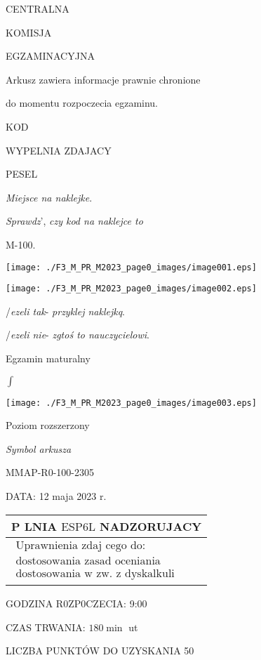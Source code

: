 \documentclass[a4paper,12pt]{article}
\begin{document}
CENTRALNA

KOMISJA

EGZAMINACYJNA

Arkusz zawiera informacje prawnie chronione

do momentu rozpoczecia egzaminu.

KOD

WYPELNIA ZDAJACY

PESEL

{\it Miejsce na naklejke}.

{\it Sprawdz}', {\it czy kod na naklejce to}

M-100.
\begin{center}
\texttt{[image: ./F3\_M\_PR\_M2023\_page0\_images/image001.eps]}

\texttt{[image: ./F3\_M\_PR\_M2023\_page0\_images/image002.eps]}
\end{center}
/{\it ezeli tak}- {\it przyklej naklejkq}.

/{\it ezeli nie}- {\it zgtoś to nauczycielowi}.

Egzamin maturalny

$\displaystyle \int$
\begin{center}
\texttt{[image: ./F3\_M\_PR\_M2023\_page0\_images/image003.eps]}
\end{center}
Poziom  rozszerzony

{\it Symbol arkusza}

MMAP-R0-100-2305

DATA: 12 maja 2023 r.
\begin{center}
\begin{tabular}{|l|}
\hline
\multicolumn{1}{|l|}{P LNIA $\mathrm{E}\mathrm{S}\mathrm{P}6\mathrm{L}$ NADZORUJACY}	\\
\hline
\multicolumn{1}{|l|}{$\begin{array}{l}\mbox{Uprawnienia zdaj cego do:}	\\	\mbox{dostosowania zasad oceniania}	\\	\mbox{dostosowania w zw. z dyskalkuli}	\end{array}$}	\\
\hline
\end{tabular}

\end{center}
GODZINA R0ZP0CZECIA: 9:00

CZAS TRWANIA: $180 \displaystyle \min$ ut

LICZBA PUNKTÓW DO UZYSKANIA 50
\end{document}
